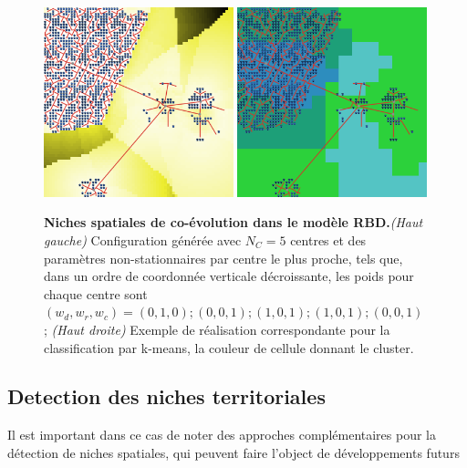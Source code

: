 \documentclass[11pt]{article}
\begin{document}
\begin{figure}
	\includegraphics[width=0.49\textwidth]{figures/ex_0_tf30.png}
	\includegraphics[width=0.49\textwidth]{figures/ex_0_tf30_rsclustering321.png}
	\caption{\textbf{Niches spatiales de co-évolution dans le modèle RBD.}\textit{(Haut gauche)} Configuration générée avec $N_C = 5$ centres et des paramètres non-stationnaires par centre le plus proche, tels que, dans un ordre de coordonnée verticale décroissante, les poids pour chaque centre sont $(w_d,w_r,w_c) = (0,1,0) ; (0,0,1) ; (1,0,1) ; (1,0,1) ; (0,0,1)$ ; \textit{(Haut droite)} Exemple de réalisation correspondante pour la classification par k-means, la couleur de cellule donnant le cluster.}
\end{figure}



\subsection{Detection des niches territoriales}

Il est important dans ce cas de noter des approches complémentaires pour la détection de niches spatiales, qui peuvent faire l'object de développements futurs

\end{document}
